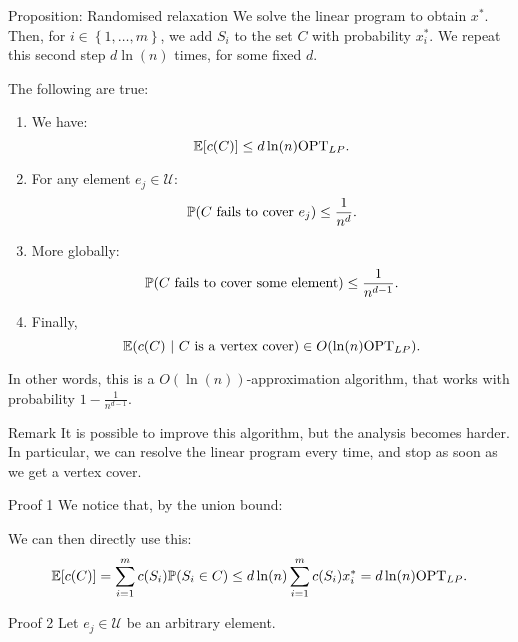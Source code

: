 \documentclass[a4paper]{article}
\begin{document}
\begin{parag}{Proposition: Randomised relaxation}
    We solve the linear program to obtain $x^*$. Then, for $i \in \left\{1, \ldots, m\right\}$, we add $S_i$ to the set $C$ with probability $x_i^*$. We repeat this second step $d \ln\left(n\right)$ times, for some fixed $d$. 

    The following are true:
    \begin{enumerate}
        \item We have:
    \[\exval\left[c\left(C\right)\right] \leq d\ln\left(n\right) \text{OPT}_{LP}.\]
        \item For any element $e_j \in \mathcal{U}$: 
        \[\prob\left(\text{$C$ fails to cover $e_j$}\right) \leq \frac{1}{n^d}.\]
        \item More globally:
        \[\prob\left(\text{$C$ fails to cover some element}\right) \leq \frac{1}{n^{d-1}}.\]
        \item Finally, 
        \[\exval\left(c\left(C\right) \suchthat \text{$C$ is a vertex cover}\right) \in O\left(\ln\left(n\right) \text{OPT}_{LP}\right).\]
    \end{enumerate}

    In other words, this is a $O\left(\ln\left(n\right)\right)$-approximation algorithm, that works with probability $1 - \frac{1}{n^{d-1}}$.

    \begin{subparag}{Remark}
        It is possible to improve this algorithm, but the analysis becomes harder. In particular, we can resolve the linear program every time, and stop as soon as we get a vertex cover.
    \end{subparag}

    \begin{subparag}{Proof 1}
        We notice that, by the union bound: 
        
        We can then directly use this:
        \[\exval\left[c\left(C\right)\right] = \sum_{i=1}^{m} c\left(S_i\right)\prob\left(S_i \in C\right) \leq d \ln\left(n\right) \sum_{i=1}^{m} c\left(S_i\right) x_i^* = d \ln\left(n\right) \text{OPT}_{LP}.\]
    \end{subparag}

    \begin{subparag}{Proof 2}
        Let $e_j \in \mathcal{U}$ be an arbitrary element. 


\end{subparag}
\end{parag}
\end{document}
